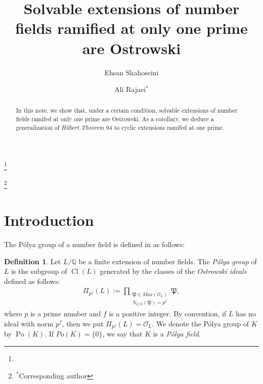 \documentclass{amsart}
\theoremstyle{definition}
\newtheorem{definition}[theorem]{Definition}
\numberwithin{equation}{section}
\DeclareMathOperator{\Po}{Po}
\DeclareMathOperator{\Cl}{Cl}
\begin{document}
\title{Solvable extensions of number fields ramified at only one prime are Ostrowski}



\author{Ehsan Shahoseini}
\address{Department of Mathematics, Tarbiat Modares University, 14115-134, Tehran, Iran}
\curraddr{} 
\thanks{}


\author{Ali Rajaei$^{*}$}
\address{Department of Mathematics, Tarbiat Modares University, 14115-134, Tehran, Iran}
\curraddr{}
\thanks{$^{*}$Corresponding author}









\begin{abstract}
In this note, we show that, under a certain condition, solvable extensions of number fields ramifed at only one prime are Ostrowski. As a corollary, we deduce a generalization of \textit{Hilbert Theorem $94$} to cyclic extensions ramifed at one prime.
\end{abstract}

\maketitle

\section{Introduction}

The P\'olya group of a number field is defined in \cite{Cahen-Chabert's book} as follows:

\begin{definition} \label{definition, Polya group} 
	Let $L/\mathbb{Q}$ be a finite extension of number fields. The \textit{P\'olya group} of $L$ is the subgroup of $\Cl(L)$ generated by the classes of the \textit{Ostrowski ideals} defined as follows:  
	\begin{align} \label{equation, Ostrowski ideal}
		\Pi_{p^f}(L):=\prod_{\substack{\mathfrak{P}\in Max(\mathcal{O}_L) \\ N_{L/\mathbb{Q}}(\mathfrak{P})=p^f}} \mathfrak{P},
	\end{align}
	where $p$ is a prime number and $f$ is a positive integer. By convention, if $L$ has no ideal with norm $p^f$, then we put $\Pi_{p^f}(L)=\mathcal{O}_L$.
	We denote the P\'olya group of $K$ by $\Po(K)$. If $Po(K)=\{0\}$, we say that $K$ is a \textit{P\'olya field}.
\end{definition}
\end{document}

